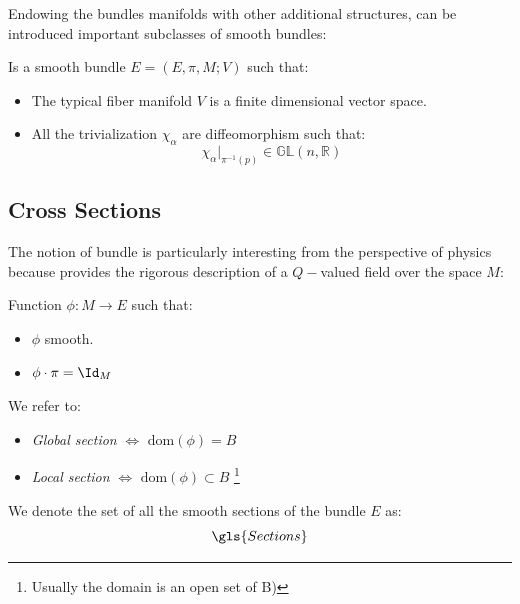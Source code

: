 \documentclass[Main]{subfiles}
\begin{document}
			
						
			Endowing the bundles manifolds with other additional structures, can be introduced important subclasses of smooth bundles:
			\begin{definition}
				Is a smooth bundle $E=(E,\pi,M;V)$ such that:
				\begin{itemize}
					\item The typical fiber manifold $V$ is a finite dimensional vector space.	
					\item All the trivialization $\chi_{\alpha} $ are diffeomorphism such that:
						\begin{displaymath}
							\chi_{\alpha}\vert_{\pi^{-1}(p)} \in \mathbb{GL}(n, \mathbb{R})
						\end{displaymath}
				\end{itemize}
			\end{definition}

		\subsection{Cross Sections}
			The notion of bundle is particularly interesting from the perspective of physics because provides the rigorous description of a $Q-$valued field over the space $M$:			
			\begin{definition}
				Function $\phi : M \rightarrow E$ such that:
					\begin{itemize}
						\item $\phi$ smooth.
						\item $\phi \cdot \pi = \Id_M$ 
					\end{itemize}
			\end{definition}
			
			\begin{notationfix}
				We refer to:
					\begin{itemize}
						\item \emph{Global section} $\Leftrightarrow$ $\textrm{dom}(\phi) = B$
						\item \emph{Local section} $\Leftrightarrow$ $\textrm{dom}(\phi) \subset B$ \footnote{Usually the domain is an open set of B)}
					\end{itemize}
				We denote the set of all the smooth sections of the bundle $E$  as:
				\begin{displaymath}
					\gls{Sections}
				\end{displaymath}
			\end{notationfix}
			
\end{document}
